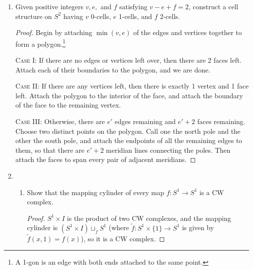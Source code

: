 \documentclass[12pt,letterpaper]{article}
\begin{document}
\begin{enumerate}
\begin{proof}(iii) 
If $X_\alpha=\tilde{X}_\alpha$ for each connected component $X_\alpha$ and path-component $\tilde{X}_\alpha$, then $${Y_\alpha = \Phi(X_\alpha) = \Phi(\tilde{X}_\alpha) = \tilde{Y}_\alpha},$$
where we are making a mild abuse of notation with $\Phi$, but the meaning should be clear.
\end{proof}

\setcounter{enumi}{13}
\item Given positive integers $v , e,$ and $f$ satisfying $v - e + f = 2$, construct a cell
structure on $S^2$ having $v$ 0-cells, $e$ 1-cells, and $f$ 2-cells.

\begin{proof}
Begin by attaching $\min(v,e)$ of the edges and vertices together to form a polygon.\footnote{A 1-gon is an edge with both ends attached to the same point.}

\textsc{Case I:} If there are no edges or vertices left over, then there are 2 faces left. Attach each of their boundaries to the polygon, and we are done. 

\textsc{Case II:} If there are any vertices left, then there is exactly 1 vertex and 1 face left. Attach the polygon to the interior of the face, and attach the boundary of the face to the remaining vertex. 

\textsc{Case III:} Otherwise, there are $e'$ edges remaining and $e'+2$ faces remaining. Choose two distinct points on the polygon. Call one the north pole and the other the south pole, and attach the endpoints of all the remaining edges to them, so that there are $e'+2$ meridian lines connecting the poles. Then attach the faces to span every pair of adjacent meridians.
\end{proof}

\pagebreak
\setcounter{enumi}{16}
\item 
	\begin{enumerate}[label=(\alph*)]
	\item  Show that the mapping cylinder of every map $f:S^1\to S^1$ is a CW complex.
	\begin{proof}
	$S^1\times I$ is the product of two CW complexes, and the mapping cylinder 
	is \linebreak 
	$(S^1\times I)\sqcup_{\tilde{f}} S^1$ 
	(where $\tilde{f}:S^1\times\{1\}\to S^1$ is given by $\tilde{f}(x,1)=f(x)$), so it is a CW complex.
	\end{proof}
	

\end{enumerate}
\end{enumerate}
\end{document}
